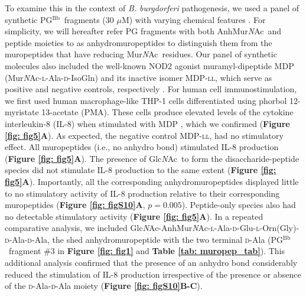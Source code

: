 \documentclass[twoside, watermark]{zHenriquesLab-StyleBioRxiv}
\newcommand{\tmu}{$\mu$} %
\newcommand{\pgbb}{PG$^\text{Bb}$}
\newcommand{\ZAEOAAG}{Glc\textit{N}Ac-AnhMur\textit{N}Ac-\textsc{l}-Ala-\textsc{d}-Glu-\textsc{l}-Orn(Gly)-\textsc{d}-Ala-\textsc{d}-Ala}
\newcommand{\NAM}{Mur\textit{N}Ac}
\newcommand{\AnhNAM}{AnhMur\textit{N}Ac}
\newcommand{\NAG}{Glc\textit{N}Ac}
\newcommand{\scl}{\textsc{l}} %
\newcommand{\scd}{\textsc{d}} %
\begin{document}
\vspace{1mm}
To examine this in the context of \textit{B. burgdorferi} pathogenesis, we used a panel of synthetic \pgbb~fragments (30 \tmu M) with varying chemical features \cite{Putnik2024}. For simplicity, we will hereafter refer PG fragments with both \AnhNAM~and peptide moieties to as anhydromuropeptides to distinguish them from the muropeptides that have reducing \NAM~residues. Our panel of synthetic molecules also included the well-known NOD2 agonist muramyl-dipeptide MDP (\NAM-\scl-Ala-\scd-IsoGln) and its inactive isomer MDP-\scl\scl, which serve as positive and negative controls, respectively \cite{Inohara2003,Mo2012}. For human cell immunostimulation, we first used human macrophage-like THP-1 cells differentiated using phorbol 12-myristate 13-acetate (PMA). These cells produce elevated levels of the cytokine interleukin-8 (IL-8) when stimulated with MDP \cite{Jakopin2019}, which we confirmed (\textbf{Figure \ref{fig: fig5}A}). As expected, the negative control MDP-\scl\scl, had no stimulatory effect. All muropeptides (i.e., no anhydro bond) stimulated IL-8 production (\textbf{Figure \ref{fig: fig5}A}). The presence of \NAG~to form the disaccharide-peptide species did not stimulate IL-8 production to the same extent (\textbf{Figure \ref{fig: fig5}A}). Importantly, all the corresponding anhydromuropeptides displayed little to no stimulatory activity of IL-8 production relative to their corresponding muropeptides (\textbf{Figure \ref{fig: figS10}A}, $p = 0.005$). Peptide-only species also had no detectable stimulatory activity (\textbf{Figure \ref{fig: fig5}A}). In a repeated comparative analysis, we included \ZAEOAAG, the shed anhydromuropeptide with the two terminal \scd-Ala (\pgbb~fragment \#3 in \textbf{Figure \ref{fig: fig1}} and \textbf{Table \ref{tab: muropep_tab}}). This additional analysis confirmed that the presence of an anhydro bond considerably reduced the stimulation of IL-8 production irrespective of the presence or absence of the \scd-Ala-\scd-Ala moiety (\textbf{Figure \ref{fig: figS10}B-C}).
\end{document}
